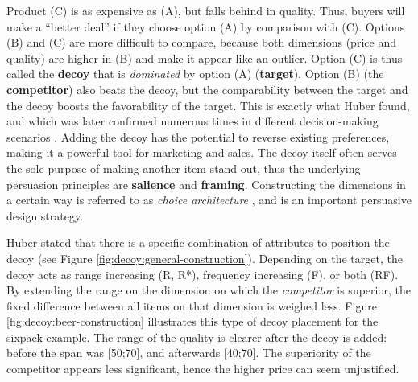Product (C) is as expensive as (A), but falls behind in quality. Thus, buyers will make a ``better deal'' if they choose option (A) by comparison with (C). Options (B) and (C) are more difficult to compare, because both dimensions (price and quality) are higher in (B) and make it appear like an outlier. Option (C) is thus called the \textbf{decoy} that is \textit{dominated} by option (A) (\textbf{target}). Option (B) (the \textbf{competitor}) also beats the decoy, but the comparability between the target and the decoy boosts the favorability of the target. This is exactly what Huber \etal found, and which was later confirmed numerous times in different decision-making scenarios \cite{Ariely1995ExplanationSubjectiveDominance}. Adding the decoy has the potential to reverse existing preferences, making it a powerful tool for marketing and sales. The decoy itself often serves the sole purpose of making another item stand out, thus the underlying persuasion principles are \textbf{salience} and \textbf{framing}. Constructing the dimensions in a certain way is referred to as \textit{choice architecture} \cite{Thaler2010ChoiceArchitecture}, and is an important persuasive design strategy. 

Huber \etal stated that there is a specific combination of attributes to position the decoy (see Figure \ref{fig:decoy:general-construction}). Depending on the target, the decoy acts as range increasing (R, R*), frequency increasing (F), or both (RF). By extending the range on the dimension on which the \textit{competitor} is superior, the fixed difference between all items on that dimension is weighed less. Figure \ref{fig:decoy:beer-construction} illustrates this type of decoy placement for the sixpack example. The range of the quality is clearer after the decoy is added: before the span was [50;70], and afterwards [40;70]. The superiority of the competitor appears less significant, hence the higher price can seem unjustified. 


